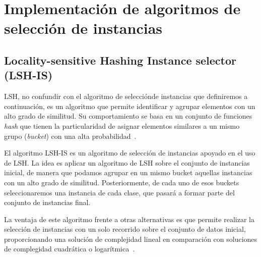 \section{Implementación de algoritmos de selección de instancias}



\subsection{Locality-sensitive Hashing Instance selector (LSH-IS)}

LSH, no confundir con el algoritmo de selecciónde instancias que definiremos a continuación, es un algoritmo que permite identificar y agrupar elementos con un alto grado de similitud. Su comportamiento se basa en un conjunto de funciones \textit{hash} que tienen la particularidad de asignar elementos similares a un mismo grupo (\textit{bucket}) con una alta probabilidad~\cite{LSHISPaper}.

El algoritmo LSH-IS es un algoritmo de selección de instancias apoyado en el uso de LSH. La idea es aplicar un  algoritmo de LSH sobre el conjunto de instancias inicial, de manera que podamos agrupar en un mismo bucket aquellas instancias con un alto grado de similitud. Posteriormente, de cada uno de esos buckets seleccionaremos una instancia de cada clase, que pasará a formar parte del conjunto de instancias final. 

La ventaja de este algoritmo frente a otras alternativas es que permite realizar la selección de instancias con un solo recorrido sobre el conjunto de datos inicial, proporcionando una solución de complejidad lineal en comparación con soluciones de complegidad cuadrática o logarítmica~\cite{LSHISPaper}.









